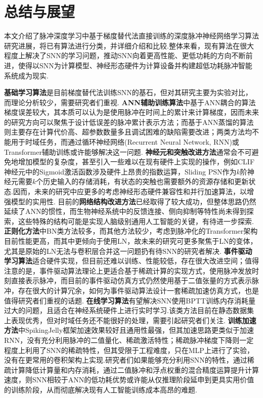 \documentclass{SCIS2020cn}
\begin{document}
\section{总结与展望}
本文介绍了脉冲深度学习中基于梯度替代法直接训练的深度脉冲神经网络学习算法研究进展，将已有算法进行分类，并详细介绍和比较.整体来看，现有算法在很大程度上解决了SNN的学习问题，推动SNN向着更高性能、更低功耗的方向不断前进，使得以SNN为计算模型、神经形态硬件为计算设备并构建超低功耗脉冲智能系统成为现实.


\textbf{基础学习算法}是目前梯度替代法训练SNN的基石，但对其研究主要为实验对比，而理论分析较少，需要研究者们重视.
\textbf{ANN辅助训练算法}中基于ANN耦合的算法梯度误差较大，其本质可以认为是使用脉冲在时间上的累计来计算梯度，因而未来的研究方向可以聚焦于设计低误差的脉冲累计表示方法；而基于ANN蒸馏的算法则主要存在计算代价高、超参数数量多且调试困难的缺陷需要改进；两类方法均不能用于时域任务，而通过循环神经网络(Recurrent Neural Network, RNN)或Transformer辅助训练或许能够解决这一问题.
\textbf{神经元和突触改进方法}通常会不可避免地增加模型的复杂度，甚至引入一些难以在现有硬件上实现的操作，例如CLIF神经元\cite{huang2024clif}中的Sigmoid激活函数涉及硬件上昂贵的指数运算，Sliding PSN\cite{fang2023parallel}作为$k$阶神经元需要$k$个历史输入的存储消耗，有状态的突触\cite{SNN-IIR}也需要额外的资源存储和更新状态.因而，未来的研究中应更多的考虑神经形态硬件兼容性和并行加速算法，以增强模型的实用性.
目前的\textbf{网络结构改进方法}已经取得了较大成功，但整体思路仍然延续了ANN的惯性，而生物神经系统中的反馈连接、侧向抑制等特性尚未得到探索，这些特殊的结构可能是实现人脑级别通用人工智能的关键，有待进一步探索.
\textbf{正则化方法}中BN类方法较多，而其他方法较少，考虑到脉冲化的Transformer架构目前性能更高，而其中更倾向于使用LN，故未来的研究可更多聚焦于LN的变体，尤其是原始的LN无法与卷积层合并这一问题扔有待SNN的研究者解决.
\textbf{事件驱动学习算法}适合硬件实现，但目前还难以训练、性能较低，存在很大改进空间；值得注意的是，事件驱动算法理论上更适合基于稀疏计算的实现方式，使用脉冲发放时刻直接表示脉冲，而目前的事件驱动仿真方式仍然使用基于二值张量的方式表示脉冲，存在很大的计算冗余，如何为事件驱动算法设计一套稀疏加速仿真方式，也是值得研究者们重视的话题.
\textbf{在线学习算法}有望解决SNN使用BPTT训练内存消耗量过大的问题，且适合在神经系统硬件上进行实时学习.该类方法目前在静态数据集上表现优秀，但对时域任务还不能很好的处理，需要引起研究者们关注.
\textbf{训练加速方法}中SpikingJelly\cite{doi:10.1126/sciadv.adi1480}框架加速效果较好且通用性最强，但其加速思路更类似于加速RNN，没有充分利用脉冲的二值量化、稀疏激活特性；稀疏脉冲梯度下降\cite{perez-nieves2021sparse}则一定程度上利用了SNN的稀疏特性，但其受限于工程难度，只在MLP上进行了实验，没有在更常用的卷积架构上实现.研究者们如果能够充分利用SNN的特性，通过稀疏计算降低计算量和内存消耗，通过二值脉冲和浮点权重的混合精度运算提升计算速度，则SNN相较于ANN的低功耗优势或许能从仅推理阶段延申到更具实用价值的训练阶段，从而彻底解决现有人工智能训练成本高昂的难题.
\end{document}
